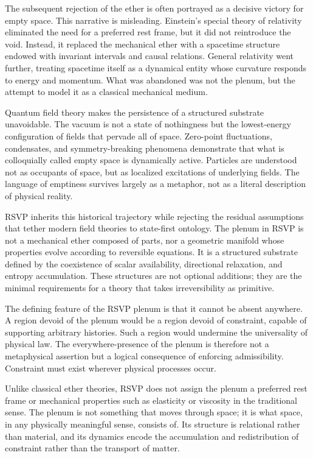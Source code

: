 \documentclass[11pt,oneside]{book}
\begin{document}
The subsequent rejection of the ether is often portrayed as a decisive victory for empty space. This narrative is misleading. Einstein’s special theory of relativity eliminated the need for a preferred rest frame, but it did not reintroduce the void. Instead, it replaced the mechanical ether with a spacetime structure endowed with invariant intervals and causal relations. General relativity went further, treating spacetime itself as a dynamical entity whose curvature responds to energy and momentum. What was abandoned was not the plenum, but the attempt to model it as a classical mechanical medium.

Quantum field theory makes the persistence of a structured substrate unavoidable. The vacuum is not a state of nothingness but the lowest-energy configuration of fields that pervade all of space. Zero-point fluctuations, condensates, and symmetry-breaking phenomena demonstrate that what is colloquially called empty space is dynamically active. Particles are understood not as occupants of space, but as localized excitations of underlying fields. The language of emptiness survives largely as a metaphor, not as a literal description of physical reality.

RSVP inherits this historical trajectory while rejecting the residual assumptions that tether modern field theories to state-first ontology. The plenum in RSVP is not a mechanical ether composed of parts, nor a geometric manifold whose properties evolve according to reversible equations. It is a structured substrate defined by the coexistence of scalar availability, directional relaxation, and entropy accumulation. These structures are not optional additions; they are the minimal requirements for a theory that takes irreversibility as primitive.

The defining feature of the RSVP plenum is that it cannot be absent anywhere. A region devoid of the plenum would be a region devoid of constraint, capable of supporting arbitrary histories. Such a region would undermine the universality of physical law. The everywhere-presence of the plenum is therefore not a metaphysical assertion but a logical consequence of enforcing admissibility. Constraint must exist wherever physical processes occur.

Unlike classical ether theories, RSVP does not assign the plenum a preferred rest frame or mechanical properties such as elasticity or viscosity in the traditional sense. The plenum is not something that moves through space; it is what space, in any physically meaningful sense, consists of. Its structure is relational rather than material, and its dynamics encode the accumulation and redistribution of constraint rather than the transport of matter.
\end{document}
